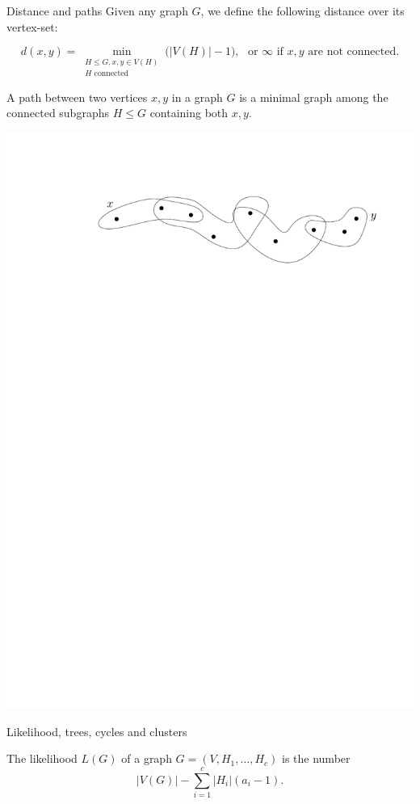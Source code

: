 \documentclass[11pt]{beamer}
\begin{document}
	\begin{frame}{Distance and paths}
		Given any graph $G$, we define the following distance over its vertex-set:
			
			\begin{equation*}d(x,y)= \min_{\substack{H \leq G, x,y\in V(H)\\ 
					H \text{ connected}}}
					 \big(|V(H)| - 1 \big), \, \, \text{ or } \infty \text{ if }
				x,y \text{ are not connected.}
			\end{equation*}
			\vspace{-0.3em}
		\begin{definition} 
			A path between two vertices $x,y$ in a graph $G$ is
			a minimal graph among the 
			connected subgraphs $H\leq G$ containing both $x,y$.
		\end{definition}
			\begin{center}
			\includegraphics[width=0.8\linewidth]{Path.pdf}
		\end{center}
	\end{frame}
	\begin{frame}{Likelihood, trees, cycles and clusters} 
		\begin{definition}
			The likelihood $L(G)$ of a graph $G=(V,H_1,\dots,H_c)$ is
			the number
			\[ |V(G)| - \sum_{i=1}^c |H_i|(a_i-1).\]
		\end{definition}

	\end{frame}
\end{document}
